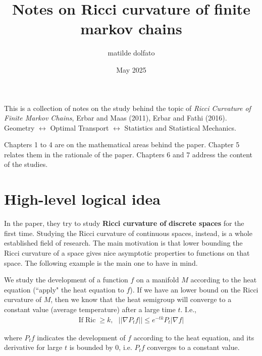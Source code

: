 \documentclass[a4paper,12pt,reqno]{amsbook}
\title{Notes on Ricci curvature of finite markov chains}
\author{matilde dolfato}
\date{May 2025}
\theoremstyle{definition} %
\newcommand{\1}{\mathbbm{1}}
\DeclareMathOperator{\Ric}{Ric}
\def\Ric{\mathop{\mathrm{Ric}}\nolimits}
\theoremstyle{plain}
\theoremstyle{remark}
\begin{document}
\maketitle
This is a collection of notes on the study behind the topic of \textit{Ricci Curvature of Finite Markov Chains}, Erbar and Maas (2011), Erbar and Fathi (2016). 
\\

Geometry $\leftrightarrow$ Optimal Transport $\leftrightarrow$ Statistics and Statistical Mechanics.

Chapters 1 to 4 are on the mathematical areas behind the paper. Chapter 5 relates them in the rationale of the paper. Chapters 6 and 7 address the content of the studies. 
\tableofcontents
\newpage
\chapter*{High-level logical idea}




In the paper, they try to study \textbf{Ricci curvature of} \textbf{discrete spaces} for the first time. Studying the Ricci curvature of continuous spaces, instead, is a whole established field of research. The main motivation is that lower bounding the Ricci curvature of a space gives nice asymptotic properties to functions on that space. The following example is the main one to have in mind. 

\begin{example}
We study the development of a function $f$ on a manifold $M$ according to the heat equation (``apply" the heat equation to $f$). If we have an lower bound on the Ricci curvature of $M$, then we know that the heat semigroup will converge to a constant value (average temperature) after a large time $t$. I.e.,
\begin{align*}
    \text{If} \Ric \ge k, \,\, \,\, ||\nabla P_t f|| \le e^{-tk}P_t |\nabla f|
\end{align*}


where $P_t f$ indicates the development of $f$ according to the heat equation, and its derivative for large $t$ is bounded by 0, i.e. $P_t f$ converges to a constant value. 
\end{example}
\end{document}
